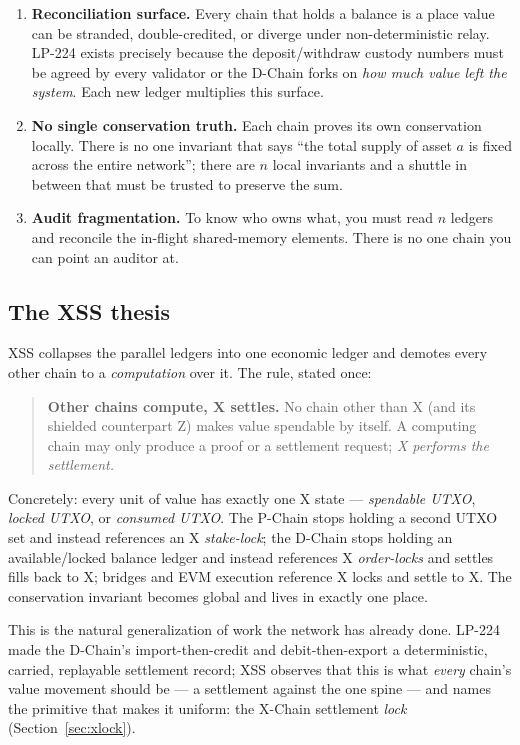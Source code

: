 \begin{enumerate}[leftmargin=2em]
\item \textbf{Reconciliation surface.} Every chain that holds a balance
  is a place value can be stranded, double-credited, or diverge under
  non-deterministic relay. LP-224 exists precisely because the
  deposit/withdraw custody numbers must be agreed by every validator or
  the D-Chain forks on \emph{how much value left the system}. Each new
  ledger multiplies this surface.
\item \textbf{No single conservation truth.} Each chain proves its own
  conservation locally. There is no one invariant that says ``the total
  supply of asset $a$ is fixed across the entire network''; there are
  $n$ local invariants and a shuttle in between that must be trusted to
  preserve the sum.
\item \textbf{Audit fragmentation.} To know who owns what, you must read
  $n$ ledgers and reconcile the in-flight shared-memory elements. There
  is no one chain you can point an auditor at.
\end{enumerate}

\subsection{The XSS thesis}

XSS collapses the parallel ledgers into one economic ledger and demotes
every other chain to a \emph{computation} over it. The rule, stated
once:

\begin{quote}
\textbf{Other chains compute, X settles.} No chain other than X (and its
shielded counterpart Z) makes value spendable by itself. A computing
chain may only produce a proof or a settlement request; \emph{X performs
the settlement.}
\end{quote}

\noindent Concretely: every unit of value has exactly one X state ---
\emph{spendable UTXO}, \emph{locked UTXO}, or \emph{consumed UTXO}. The
P-Chain stops holding a second UTXO set and instead references an X
\emph{stake-lock}; the D-Chain stops holding an available/locked balance
ledger and instead references X \emph{order-locks} and settles fills back
to X; bridges and EVM execution reference X locks and settle to X. The
conservation invariant becomes global and lives in exactly one place.

This is the natural generalization of work the network has already done.
LP-224 made the D-Chain's import-then-credit and debit-then-export a
deterministic, carried, replayable settlement record; XSS observes that
this is what \emph{every} chain's value movement should be --- a
settlement against the one spine --- and names the primitive that makes
it uniform: the X-Chain settlement \emph{lock}
(Section~\ref{sec:xlock}).
